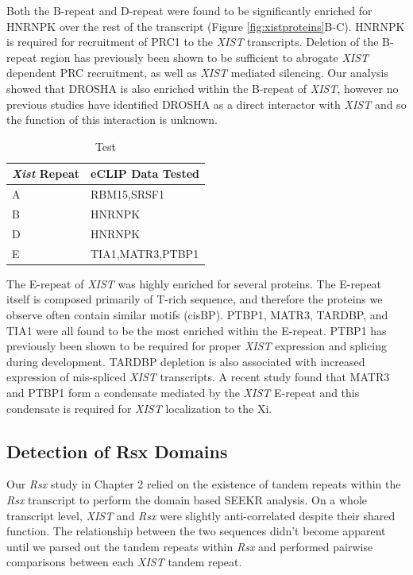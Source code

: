 Both the B-repeat and D-repeat were found to be significantly enriched for HNRNPK over the rest of the transcript (Figure \ref{fig:xistproteins}B-C). HNRNPK is required for recruitment of PRC1 to the \emph{XIST} transcripts. Deletion of the B-repeat region has previously been shown to be sufficient to abrogate \emph{XIST} dependent PRC recruitment, as well as \emph{XIST} mediated silencing. Our analysis showed that DROSHA is also enriched within the B-repeat of \emph{XIST}, however no previous studies have identified DROSHA as a direct interactor with \emph{XIST} and so the function of this interaction is unknown.

\begin{table}[h]
\centering
\begin{tabular}{|l|l|}
\hline 
\emph{Xist} Repeat&eCLIP Data Tested                      \\
\hline 
    A&RBM15,SRSF1    \\
      B & HNRNPK\\
      D  & HNRNPK\\
      E & TIA1,MATR3,PTBP1\\
\hline 
\end{tabular}
\caption{Test}
\label{tbl:eclipscan}
\end{table}

The E-repeat of \emph{XIST} was highly enriched for several proteins. The E-repeat itself is composed primarily of T-rich sequence, and therefore the proteins we observe often contain similar motifs (cisBP). PTBP1, MATR3, TARDBP, and TIA1 were all found to be the most enriched within the E-repeat. PTBP1 has previously been shown to be required for proper \emph{XIST} expression and splicing during development. TARDBP depletion is also associated with increased expression of mis-spliced \emph{XIST} transcripts. A recent study found that MATR3 and PTBP1 form a condensate mediated by the \emph{XIST} E-repeat and this condensate is required for \emph{XIST} localization to the Xi. 

\subsection{Detection of Rsx Domains}
Our \emph{Rsx} study in Chapter 2 relied on the existence of tandem repeats within the \emph{Rsx} transcript to perform the domain based SEEKR analysis. On a whole transcript level, \emph{XIST} and \emph{Rsx} were slightly anti-correlated despite their shared function. The relationship between the two sequences didn't become apparent until we parsed out the tandem repeats within \emph{Rsx} and performed pairwise comparisons between each \emph{XIST} tandem repeat. 

